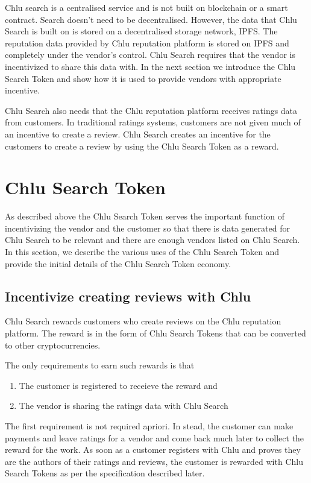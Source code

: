 \documentclass[a4paper]{article}
\begin{document}
Chlu search is a centralised service and is not built on blockchain or
a smart contract. Search doesn't need to be decentralised. However,
the data that Chlu Search is built on is stored on a decentralised
storage network, IPFS. The reputation data provided by Chlu reputation
platform is stored on IPFS and completely under the vendor's
control. Chlu Search requires that the vendor is incentivized to share
this data with. In the next section we introduce the Chlu Search Token
and show how it is used to provide vendors with appropriate incentive.

Chlu Search also needs that the Chlu reputation platform receives
ratings data from customers. In traditional ratings systems, customers
are not given much of an incentive to create a review. Chlu Search
creates an incentive for the customers to create a review by using the
Chlu Search Token as a reward.

\section{Chlu Search Token}

As described above the Chlu Search Token serves the important function
of incentivizing the vendor and the customer so that there is data
generated for Chlu Search to be relevant and there are enough vendors
listed on Chlu Search. In this section, we describe the various uses
of the Chlu Search Token and provide the initial details of the Chlu
Search Token economy.

\subsection{Incentivize creating reviews with Chlu}

Chlu Search rewards customers who create reviews on the Chlu
reputation platform. The reward is in the form of Chlu Search Tokens
that can be converted to other cryptocurrencies.

The only requirements to earn such rewards is that

\begin{enumerate}
\item The customer is registered to receieve the reward and
\item The vendor is sharing the ratings data with Chlu Search
\end{enumerate}

The first requirement is not required apriori. In stead, the customer
can make payments and leave ratings for a vendor and come back much
later to collect the reward for the work. As soon as a customer
registers with Chlu and proves they are the authors of their ratings
and reviews, the customer is rewarded with Chlu Search Tokens as per
the specification described later.
\end{document}
